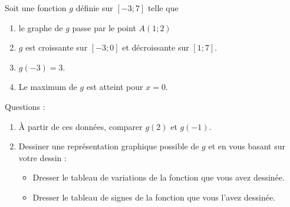 
\begin{exercice}[\ldots/5]\label{exosmath-0636}

    Soit une fonction \( g\) définie sur \( [-3;7]\) telle que
    \begin{enumerate}
        \item
            le graphe de \( g\) passe par le point \( A(1;2)\)
        \item
            \( g\) est croissante sur \( [-3;0]\) et décroissante sur \( [1;7]\).
        \item
            \( g(-3)=3\).
        \item
            Le maximum de \( g\) est atteint pour \( x=0\).
    \end{enumerate}

    Questions :
    \begin{enumerate}
        \item
            À partir de ces données, comparer \( g(2)\) et \( g(-1)\).
        \item
            Dessiner une représentation graphique possible de \( g\) et en vous basant sur votre dessin :                
            \begin{itemize}
        \item
            Dresser le tableau de variations de la fonction que vous avez dessinée.
        \item
            Dresser le tableau de signes de la fonction que vous l'avez dessinée.
            \end{itemize}
    \end{enumerate}

\end{exercice}
